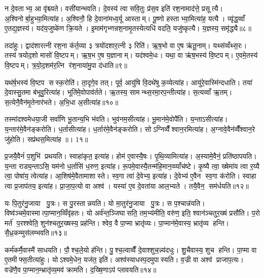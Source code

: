 न दे॒वताभ्य॒ आ वृ॑श्च्यते। वसी॑यान्भवति। दे॒वस्य॑ त्वा सवि॒तुः प्र॑स॒व इति॑ रश॒नामाद॑त्ते॒ प्रसूत्यै। अ॒श्विनोर्बा॒हुभ्या॒मित्या॑ह। अ॒श्विनौ॒ हि दे॒वाना॑मध्व॒र्यू आस्ताम्। पू॒ष्णो हस्ताभ्या॒मित्या॑ह॒ यत्यै। व्यृ॑द्ध॒व्वाँ ए॒तद्य॒ज्ञस्य॑। यद॑य॒जुष्के॑ण क्रि॒यते। इ॒माम॑गृभ्णन्रश॒नामृ॒तस्येत्यधि॑ वदति॒ यजु॑ष्कृत्यै। य॒ज्ञस्य॒ समृ॑द्ध्यै॥८॥

तदा॑हुः। द्वाद॑शारत्नी रश॒ना क॑र्त॒व्या ३ त्रयो॑दशार॒त्नी ३ रिति॑। ऋ॒ष॒भो वा ए॒ष ऋ॑तू॒नाम्। यथ्स॑व्वँथ्स॒रः। तस्य॑ त्रयोद॒शो मासो॑ वि॒ष्टपम्। ऋ॒ष॒भ ए॒ष य॒ज्ञानाम्। यद॑श्वमे॒धः। यथा॒ वा ऋ॑ष॒भस्य॑ वि॒ष्टपम्। ए॒वमे॒तस्य॑ वि॒ष्टपम्। त्र॒यो॒द॒शम॑र॒त्नि र॑श॒नाया॑मु॒पा द॑धाति॥९॥

यथ॑र्\mbox{}ष॒भस्य॑ वि॒ष्टप सस्क॒रोति॑। ता॒दृगे॒व तत्। पूर्व॒ आयु॑षि वि॒दथे॑षु क॒व्येत्या॑ह। आयु॑रे॒वास्मि॑न्दधाति। तया॑ दे॒वास्सु॒तमा ब॑भूवु॒रित्या॑ह। भूति॑मे॒वोपाव॑र्तते। ऋ॒तस्य॒ सामन्थ्स॒रमा॒रप॒न्तीत्या॑ह। स॒त्यव्वाँ ऋ॒तम्। स॒त्येनै॒वैन॑मृ॒तेनार॑भते। अ॒भि॒धा अ॒सीत्या॑ह॥१०॥

तस्मा॑दश्वमेधया॒जी सर्वा॑णि भू॒तान्य॒भि भ॑वति। भुव॑नम॒सीत्या॑ह। भू॒मान॑मे॒वोपै॑ति। य॒न्ताऽसीत्या॑ह। य॒न्तार॑मे॒वैन॑ङ्करोति। ध॒र्तासीत्या॑ह। ध॒र्तार॑मे॒वैन॑ङ्करोति। सोऽग्निव्वैँश्वान॒रमित्या॑ह। अ॒ग्नावे॒वैन॑व्वैँश्वान॒रे जु॑होति। सप्र॑थस॒मित्या॑ह ॥। 1१॥

प्र॒जयै॒वैनं॑ प॒शुभि॑ प्रथयति। स्वाहा॑कृत॒ इत्या॑ह। होम॑ ए॒वास्यै॒षः। पृ॒थि॒व्यामित्या॑ह। अ॒स्यामे॒वैनं॒ प्रति॑ष्ठापयति। य॒न्ता राड्य॒न्ताऽसि॒ यम॑नो ध॒र्तासि॑ ध॒रुण॒ इत्या॑ह। रू॒पमे॒वास्यै॒तन्म॑हि॒मान॒व्व्याँच॑ष्टे। कृ॒ष्यै त्वा॒ ख्षेमा॑य त्वा र॒य्यै त्वा॒ पोषा॑य॒ त्वेत्या॑ह। आ॒शिष॑मे॒वैतामाशास्ते। स्व॒गा त्वा॑ दे॒वेभ्य॒ इत्या॑ह। दे॒वेभ्य॑ ए॒वैन स्व॒गा क॑रोति। स्वाहा त्वा प्र॒जाप॑तय॒ इत्या॑ह। प्रा॒जा॒प॒त्यो वा अश्व॑। यस्या॑ ए॒व दे॒वता॑या आल॒भ्यते। तयै॒वैन॒ सम॑र्धयति॥१२॥\anuvakamend[ब॒ध्ना॒ति॒ समृ॑द्ध्या उ॒पाद॑धात्य॒सीत्या॑ह॒ सप्र॑थस॒मित्या॑ह दे॒वेभ्य॒ इत्या॑ह॒ पञ्च॑ च]

यः पि॒तुर॑नु॒जाया पु॒त्रः। स पु॒रस्तान्नयति। यो मा॒तुर॑नु॒जाया पु॒त्रः। स प॒श्चान्न॑यति। विष्व॑ञ्चमे॒वास्मात्पा॒प्मान॒व्विँवृ॑हतः। यो अर्व॑न्त॒ञ्जिघासति॒ तम॒भ्य॑मीति॒ वरु॑ण॒ इति॒ श्वान॑ञ्चतुर॒ख्षं प्रसौ॑ति। प॒रो मर्त॑ प॒रश्श्वेति॒ शुन॑श्चतुर॒ख्षस्य॒ प्रह॑न्ति। श्वेव॒ वै पा॒प्मा भ्रातृ॑व्यः। पा॒प्मान॑मे॒वास्य॒ भ्रातृ॑व्य हन्ति। सै॒ध्र॒कम्मुस॑लम्भवति॥१३॥

कर्म॑कर्मै॒वास्मै॑ साधयति। पौ॒श्च॒ले॒यो ह॑न्ति। पु॒श्च॒ल्वाव्वैँ दे॒वाश्शुच॒न्न्य॑दधुः। शु॒चैवास्य॒ शुच हन्ति। पा॒प्मा वा ए॒तमीफ्स॒तीत्या॑हुः। योऽश्वमे॒धेन॒ यज॑त॒ इति॑। अश्व॑स्याधस्प॒दमुपास्यति। व॒ज्री वा अश्व॑ प्राजाप॒त्यः। वज्रे॑णै॒व पा॒प्मान॒म्भ्रातृ॑व्य॒मव॑ क्रामति। द॒ख्षि॒णाऽप॑ प्लावयति॥१४॥

